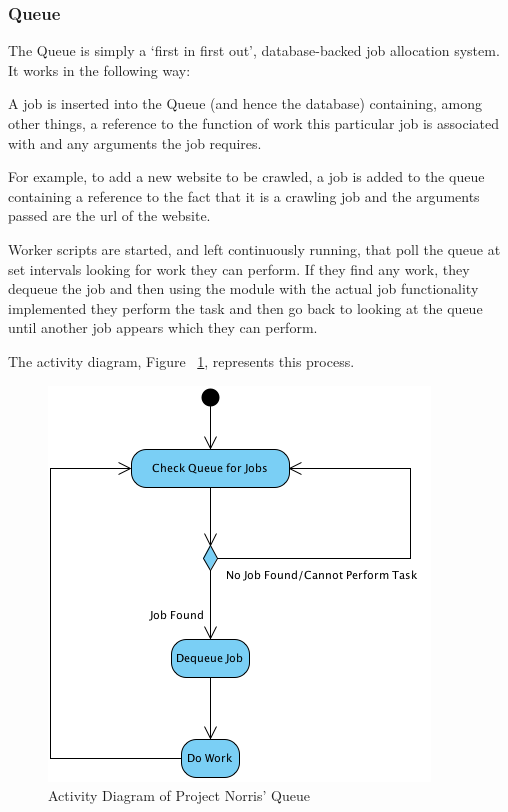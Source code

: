 \documentclass[12pt,a4paper]{article}
\begin{document}
\subsubsection{Queue}
The Queue is simply a `first in first out', database-backed job allocation system.  It works in the following way:

A job is inserted into the Queue (and hence the database) containing, among other things, a reference to the function of work this particular job is associated with and any arguments the job requires.

For example, to add a new website to be crawled, a job is added to the queue containing a reference to the fact that it is a crawling job and the arguments passed are the url of the website.

Worker scripts are started, and left continuously running, that poll the queue at set intervals looking for work they can perform.  If they find any work, they dequeue the job and then using the module with the actual job functionality implemented they perform the task and then go back to looking at the queue until another job appears which they can perform.

The activity diagram, Figure ~\ref{fig:queue}, represents this process.

\begin{figure}[!ht]
    \begin{center}
        \includegraphics[scale=0.7]{images/queue_activity_diagram.png}    
    \end{center}
    \caption{Activity Diagram of Project Norris' Queue}
    \label{fig:queue}
\end{figure}
\end{document}
